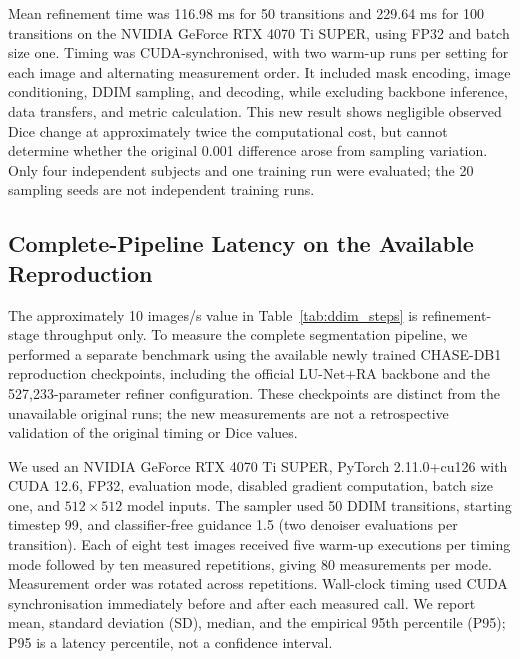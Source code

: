 \documentclass[jimaging,article,submit,pdftex,moreauthors]
  {Definitions/mdpi}
\begin{document}
Mean refinement time was 116.98 ms for 50 transitions and 229.64 ms for 100 transitions on the NVIDIA GeForce RTX 4070 Ti SUPER, using FP32 and batch size one. Timing was CUDA-synchronised, with two warm-up runs per setting for each image and alternating measurement order. It included mask encoding, image conditioning, DDIM sampling, and decoding, while excluding backbone inference, data transfers, and metric calculation. This new result shows negligible observed Dice change at approximately twice the computational cost, but cannot determine whether the original 0.001 difference arose from sampling variation. Only four independent subjects and one training run were evaluated; the 20 sampling seeds are not independent training runs.


\subsection{Complete-Pipeline Latency on the Available Reproduction}
\label{sec:pipeline_latency}

The approximately 10 images/s value in Table~\ref{tab:ddim_steps} is refinement-stage throughput only. To measure the complete segmentation pipeline, we performed a separate benchmark using the available newly trained CHASE-DB1 reproduction checkpoints, including the official LU-Net+RA backbone and the 527,233-parameter refiner configuration. These checkpoints are distinct from the unavailable original runs; the new measurements are not a retrospective validation of the original timing or Dice values.

We used an NVIDIA GeForce RTX 4070 Ti SUPER, PyTorch 2.11.0+cu126 with CUDA 12.6, FP32, evaluation mode, disabled gradient computation, batch size one, and $512\times512$ model inputs. The sampler used 50 DDIM transitions, starting timestep 99, and classifier-free guidance 1.5 (two denoiser evaluations per transition). Each of eight test images received five warm-up executions per timing mode followed by ten measured repetitions, giving 80 measurements per mode. Measurement order was rotated across repetitions. Wall-clock timing used CUDA synchronisation immediately before and after each measured call. We report mean, standard deviation (SD), median, and the empirical 95th percentile (P95); P95 is a latency percentile, not a confidence interval.
\end{document}
